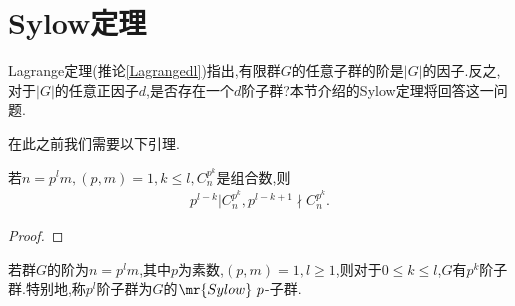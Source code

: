 \section{Sylow定理}
Lagrange定理(推论\ref{Lagrangedl})指出,有限群$G$的任意子群的阶是$|G|$的因子.反之,对于$|G|$的任意正因子$d$,是否存在一个$d$阶子群?本节介绍的Sylow定理将回答这一问题.

在此之前我们需要以下引理.
\begin{lemma}\label{p79yl}
    若$n=p^lm,(p,m)=1,k\leq l,C_n^{p^k}$是组合数,则\begin{align*}
        p^{l-k}|C_n^{p^k},p^{l-k+1}\nmid C_n^{p^k}.
    \end{align*}
\end{lemma}
\begin{proof}
    \stars
\end{proof}
\begin{theorem}[Sylow第一定理]\label{xldydl}
    若群$G$的阶为$n=p^lm$,其中$p$为素数,$(p,m)=1,l\geq1$,则对于$0\leq k\leq l$,$G$有$p^k$阶子群.特别地,称$p^l$阶子群为$G$的$\mr{Sylow}\ p$-子群.
\end{theorem}
